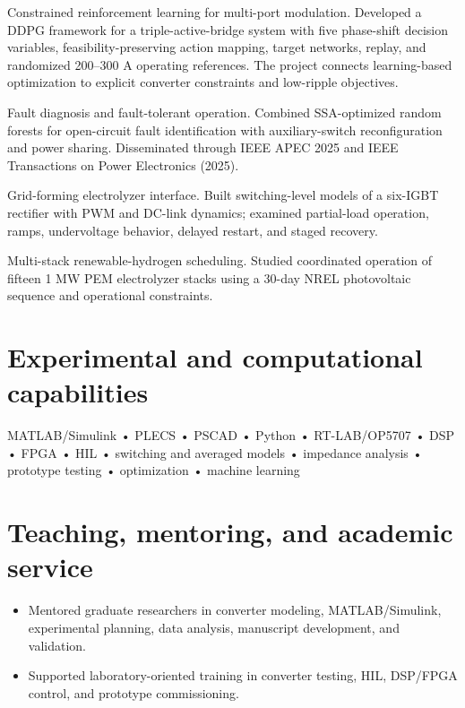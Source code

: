 \documentclass[10pt,a4paper]{article}
\begin{document}
Constrained reinforcement learning for multi-port modulation. Developed a DDPG framework for a triple-active-bridge system with five phase-shift decision variables, feasibility-preserving action mapping, target networks, replay, and randomized 200–300 A operating references. The project connects learning-based optimization to explicit converter constraints and low-ripple objectives.\par

Fault diagnosis and fault-tolerant operation. Combined SSA-optimized random forests for open-circuit fault identification with auxiliary-switch reconfiguration and power sharing. Disseminated through IEEE APEC 2025 and IEEE Transactions on Power Electronics (2025).\par

Grid-forming electrolyzer interface. Built switching-level models of a six-IGBT rectifier with PWM and DC-link dynamics; examined partial-load operation, ramps, undervoltage behavior, delayed restart, and staged recovery.\par

Multi-stack renewable-hydrogen scheduling. Studied coordinated operation of fifteen 1 MW PEM electrolyzer stacks using a 30-day NREL photovoltaic sequence and operational constraints.\par

\section*{Experimental and computational capabilities}

MATLAB/Simulink • PLECS • PSCAD • Python • RT-LAB/OP5707 • DSP • FPGA • HIL • switching and averaged models • impedance analysis • prototype testing • optimization • machine learning\par

\section*{Teaching, mentoring, and academic service}

\begin{itemize}\item Mentored graduate researchers in converter modeling, MATLAB/Simulink, experimental planning, data analysis, manuscript development, and validation.\end{itemize}

\begin{itemize}\item Supported laboratory-oriented training in converter testing, HIL, DSP/FPGA control, and prototype commissioning.\end{itemize}
\end{document}
